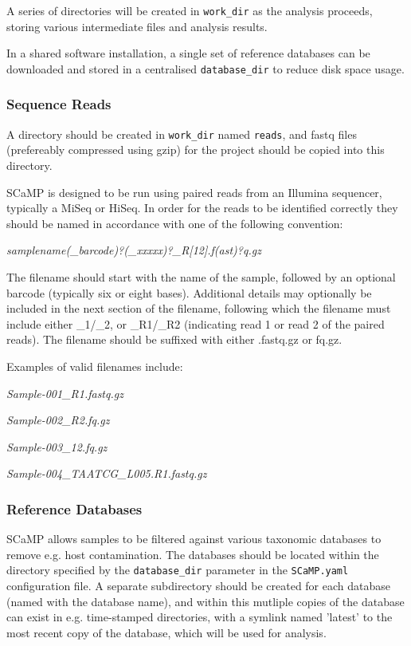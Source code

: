 \documentclass[a4paper,10pt]{article}
\newenvironment{tight_itemize}{
\begin{itemize}
  \setlength{\itemsep}{0pt}
  \setlength{\parskip}{0pt}
}{\end{itemize}}
\begin{document}
A series of directories will be created in {\tt work\_dir} as the analysis
proceeds, storing various intermediate files and analysis results. 

In a shared software installation, a single set of reference databases can be
downloaded and stored in a centralised {\tt database\_dir} to reduce disk space
usage. 

\subsubsection{Sequence Reads}

A directory should be created in {\tt work\_dir} named {\tt reads}, and fastq
files (prefereably compressed using gzip) for the project should be copied into
this directory.

SCaMP is designed to be run using paired reads from an Illumina sequencer,
typically a MiSeq or HiSeq. In order for the reads to be identified correctly
they should be named in accordance with one of the following convention:

\textit{samplename(\_barcode)?(\_xxxxx)?\_R[12].f(ast)?q.gz}

The filename should start with the name of the sample, followed by an optional
barcode (typically six or eight bases). Additional details may optionally be
included in the next section of the filename, following which the filename must
include either \_1/\_2, or \_R1/\_R2 (indicating read 1 or read 2 of the paired
reads). The filename should be suffixed with either .fastq.gz or fq.gz.

Examples of valid filenames include:
\begin{tight_itemize}
\item \textit{Sample-001\_R1.fastq.gz}
\item \textit{Sample-002\_R2.fq.gz}
\item \textit{Sample-003\_12.fq.gz}
\item \textit{Sample-004\_TAATCG\_L005.R1.fastq.gz}
\end{tight_itemize}

\subsubsection{Reference Databases}

SCaMP allows samples to be filtered against various taxonomic databases to
remove e.g. host contamination. The databases should be located within the
directory specified by the {\tt database\_dir} parameter in the {\tt SCaMP.yaml}
configuration file. A separate subdirectory should be created for each database
(named with the database name), and within this mutliple copies of the database
can exist in e.g. time-stamped directories, with a symlink named 'latest' to
the most recent copy of the database, which will be used for analysis.
\end{document}
